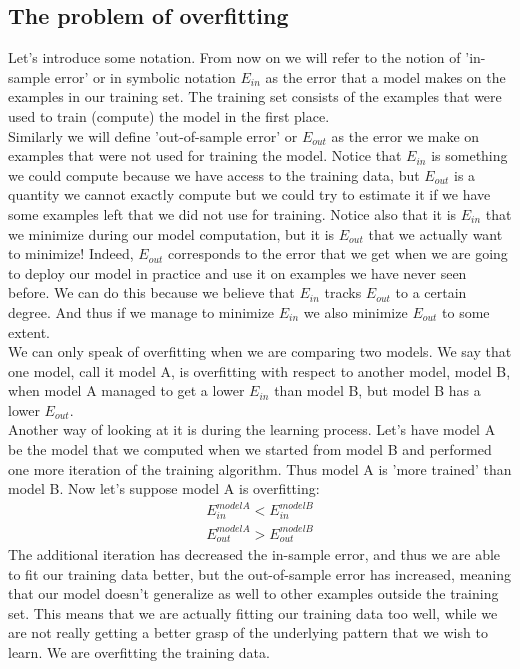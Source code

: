 \subsection{The problem of overfitting}
Let's introduce some notation. From now on we will refer to the notion of 'in-sample error' or in symbolic notation $E_{in}$ as the error that a model makes on the examples in our training set. The training set consists of the examples that were used to train (compute) the model in the first place. \\
Similarly we will define 'out-of-sample error' or $E_{out}$ as the error we make on examples that were not used for training the model. Notice that $E_{in}$ is something we could compute because we have access to the training data, but $E_{out}$ is a quantity we cannot exactly compute but we could try to estimate it if we have some examples left that we did not use for training. Notice also that it is $E_{in}$ that we minimize during our model computation, but it is $E_{out}$ that we actually want to minimize! Indeed, $E_{out}$ corresponds to the error that we get when we are going to deploy our model in practice and use it on examples we have never seen before. We can do this because we believe that $E_{in}$ tracks $E_{out}$ to a certain degree. And thus if we manage to minimize $E_{in}$ we also minimize $E_{out}$ to some extent. \\
We can only speak of overfitting when we are comparing two models. We say that one model, call it model A, is overfitting with respect to another model, model B, when model A managed to get a lower $E_{in}$ than model B, but model B has a lower $E_{out}$. \\
Another way of looking at it is during the learning process. Let's have model A be the model that we computed when we started from model B and performed one more iteration of the training algorithm. Thus model A is 'more trained' than model B. Now let's suppose model A is overfitting:
\begin{align}
E_{in}^{modelA} < E_{in}^{modelB} \\
E_{out}^{modelA} > E_{out}^{modelB}
\end{align}
The additional iteration has decreased the in-sample error, and thus we are able to fit our training data better, but the out-of-sample error has increased, meaning that our model doesn't generalize as well to other examples outside the training set. This means that we are actually fitting our training data too well, while we are not really getting a better grasp of the underlying pattern that we wish to learn. We are overfitting the training data.\\
